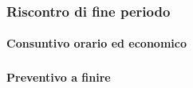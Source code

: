 \subsubsection{Riscontro di fine periodo}


\paragraph{Consuntivo orario ed economico}
\subparagraph*{}

\contabilitaTable{
	
}


\paragraph{Preventivo a finire}
\subparagraph*{}

\pafTable{
	
}